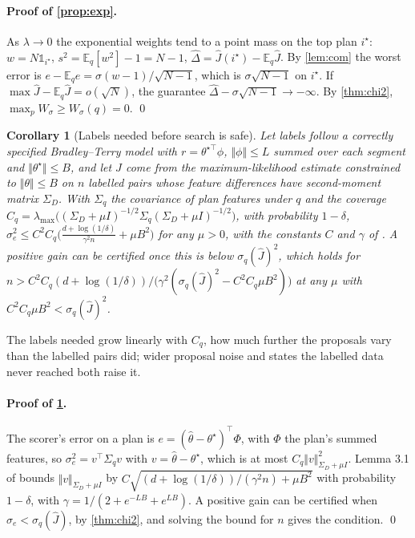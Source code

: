 \documentclass{article}
\theoremstyle{plain}
\newtheorem{corollary}[theorem]{Corollary}
\theoremstyle{remark}
\newcommand{\E}{\mathbb{E}}
\newcommand{\Jh}{\hat{J}}
\begin{document}
\paragraph{Proof of \cref{prop:exp}.} As $\lambda\to0$ the exponential weights tend to a point mass on the top plan $i^\star$:
$w=N\mathbb 1_{i^\star}$, $s^2=\E_q[w^2]-1=N-1$, $\hat\Delta=\Jh(i^\star)-\E_q\Jh$. By \cref{lem:com} the worst error is
$e-\E_qe=\sigma(w-1)/\sqrt{N-1}$, which is $\sigma\sqrt{N-1}$ on $i^\star$. If $\max\Jh-\E_q\Jh=o(\sqrt N)$, the guarantee
$\hat\Delta-\sigma\sqrt{N-1}\to-\infty$. By \cref{thm:chi2}, $\max_pW_\sigma\ge W_\sigma(q)=0$. \qed

\begin{corollary}[Labels needed before search is safe]\label{cor:labels}
Let labels follow a correctly specified Bradley--Terry model with $r=\theta^{\star\top}\phi$, $\Vert\phi\Vert\le L$
summed over each segment and $\Vert\theta^\star\Vert\le B$, and let $\Jh$ come from the maximum-likelihood estimate
constrained to $\Vert\theta\Vert\le B$ on $n$ labelled pairs whose feature differences have second-moment matrix
$\Sigma_D$. With $\Sigma_q$ the covariance of plan features under $q$ and the coverage
$C_q=\lambda_{\max}\big((\Sigma_D+\mu I)^{-1/2}\Sigma_q(\Sigma_D+\mu I)^{-1/2}\big)$, with probability $1-\delta$,
$\sigma_e^2\le C^2C_q\big(\tfrac{d+\log(1/\delta)}{\gamma^2n}+\mu B^2\big)$ for any $\mu>0$, with the constants $C$
and $\gamma$ of \citet{zhu2023principled}. A positive gain can be certified once this is below $\sigma_q(\Jh)^2$, which holds for
$n>C^2C_q(d+\log(1/\delta))/\big(\gamma^2(\sigma_q(\Jh)^2-C^2C_q\mu B^2)\big)$ at any $\mu$ with
$C^2C_q\mu B^2<\sigma_q(\Jh)^2$.
\end{corollary}
The labels needed grow linearly with $C_q$, how much further the proposals vary than the labelled pairs did; wider
proposal noise and states the labelled data never reached both raise it.

\paragraph{Proof of \cref{cor:labels}.} The scorer's error on a plan is $e=(\hat\theta-\theta^\star)^\top\Phi$, with $\Phi$ the
plan's summed features, so $\sigma_e^2=v^\top\Sigma_qv$ with $v=\hat\theta-\theta^\star$, which is at most
$C_q\Vert v\Vert^2_{\Sigma_D+\mu I}$. Lemma 3.1 of \citet{zhu2023principled} bounds $\Vert v\Vert_{\Sigma_D+\mu I}$ by
$C\sqrt{(d+\log(1/\delta))/(\gamma^2n)+\mu B^2}$ with probability $1-\delta$, with $\gamma=1/(2+e^{-LB}+e^{LB})$. A positive
gain can be certified when $\sigma_e<\sigma_q(\Jh)$, by \cref{thm:chi2}, and solving the bound for $n$ gives the
condition. \qed
\end{document}
